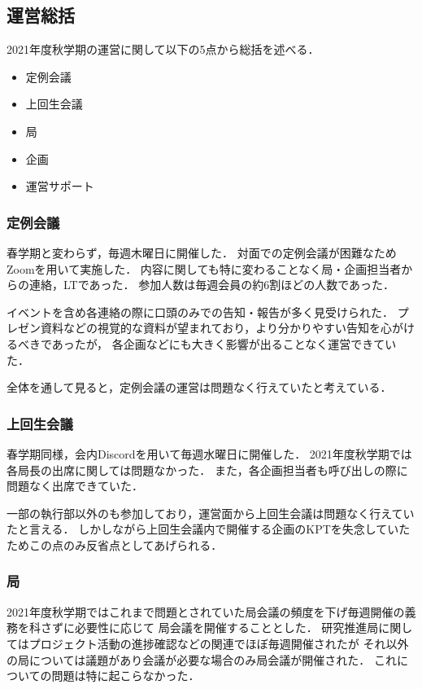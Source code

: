 \subsection*{運営総括}


2021年度秋学期の運営に関して以下の5点から総括を述べる．
\begin{itemize}
    \item 定例会議
    \item 上回生会議
    \item 局
    \item 企画
    \item 運営サポート
\end{itemize}

\subsubsection{定例会議}
春学期と変わらず，毎週木曜日に開催した．
対面での定例会議が困難なためZoomを用いて実施した．
内容に関しても特に変わることなく局・企画担当者からの連絡，LTであった．
参加人数は毎週会員の約6割ほどの人数であった．

イベントを含め各連絡の際に口頭のみでの告知・報告が多く見受けられた．
プレゼン資料などの視覚的な資料が望まれており，より分かりやすい告知を心がけるべきであったが，
各企画などにも大きく影響が出ることなく運営できていた．

全体を通して見ると，定例会議の運営は問題なく行えていたと考えている．

\subsubsection{上回生会議}
春学期同様，会内Discordを用いて毎週水曜日に開催した．
2021年度秋学期では各局長の出席に関しては問題なかった．
また，各企画担当者も呼び出しの際に問題なく出席できていた．

一部の執行部以外の\thirdGrade{}も参加しており，運営面から上回生会議は問題なく行えていたと言える．
しかしながら上回生会議内で開催する企画のKPTを失念していたためこの点のみ反省点としてあげられる．

\subsubsection{局}
2021年度秋学期ではこれまで問題とされていた局会議の頻度を下げ毎週開催の義務を科さずに必要性に応じて
局会議を開催することとした．
研究推進局に関してはプロジェクト活動の進捗確認などの関連でほぼ毎週開催されたが
それ以外の局については議題があり会議が必要な場合のみ局会議が開催された．
これについての問題は特に起こらなかった．

